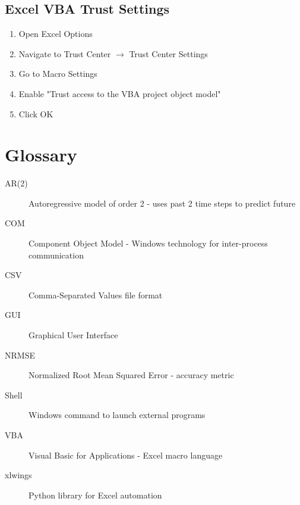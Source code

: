 \documentclass[12pt,a4paper]{report}
\begin{document}
\section{Excel VBA Trust Settings}
\begin{enumerate}
    \item Open Excel Options
    \item Navigate to Trust Center $\rightarrow$ Trust Center Settings
    \item Go to Macro Settings
    \item Enable "Trust access to the VBA project object model"
    \item Click OK
\end{enumerate}

\chapter{Glossary}

\begin{description}
    \item[AR(2)] Autoregressive model of order 2 - uses past 2 time steps to predict future
    \item[COM] Component Object Model - Windows technology for inter-process communication
    \item[CSV] Comma-Separated Values file format
    \item[GUI] Graphical User Interface
    \item[NRMSE] Normalized Root Mean Squared Error - accuracy metric
    \item[Shell] Windows command to launch external programs
    \item[VBA] Visual Basic for Applications - Excel macro language
    \item[xlwings] Python library for Excel automation
\end{description}
\end{document}

